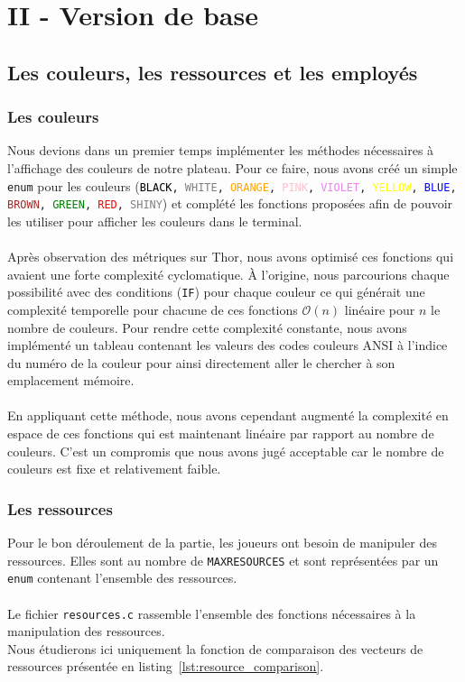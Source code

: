 
\vspace*{-0.9cm}
\section*{II - Version de base}
\subsection*{Les couleurs, les ressources et les employés}
\subsubsection*{Les couleurs}
Nous devions dans un premier temps implémenter les méthodes nécessaires à l'affichage des couleurs de notre plateau.
Pour ce faire, nous avons créé un simple \texttt{enum} pour les couleurs (\texttt{\textcolor{black}{BLACK}, \textcolor{gray}{WHITE}, \textcolor{orange}{ORANGE}, \textcolor{pink}{PINK}, \textcolor{violet}{VIOLET}, \textcolor{yellow}{YELLOW}, \textcolor{blue}{BLUE}, \textcolor{brown}{BROWN}, \textcolor{green}{GREEN}, \textcolor{red}{RED}, \textcolor{gray}{SHINY}}) et complété les fonctions proposées afin de pouvoir les utiliser pour afficher les couleurs dans le terminal.\\ \\
Après observation des métriques sur Thor, nous avons optimisé ces fonctions qui avaient une forte complexité cyclomatique.
À l'origine, nous parcourions chaque possibilité avec des conditions (\texttt{IF}) pour chaque couleur ce qui générait une complexité temporelle pour chacune de ces fonctions \(\mathcal{O}(n)\) linéaire pour \(n\) le nombre de couleurs. Pour rendre cette complexité constante, nous avons implémenté un tableau contenant les valeurs des codes couleurs ANSI à l'indice du numéro de la couleur pour ainsi directement aller le chercher à son emplacement mémoire.\\ \\
En appliquant cette méthode, nous avons cependant augmenté la complexité en espace de ces fonctions qui est maintenant linéaire par rapport au nombre de couleurs. C'est un compromis que nous avons jugé acceptable car le nombre de couleurs est fixe et relativement faible.

\subsubsection*{Les ressources}
Pour le bon déroulement de la partie, les joueurs ont besoin de manipuler des ressources.
Elles sont au nombre de \texttt{MAX\textunderscore RESOURCES} et sont représentées par un \texttt{enum} contenant l'ensemble des ressources. \\ \\
Le fichier \texttt{resources.c} rassemble l'ensemble des fonctions nécessaires à la manipulation des ressources.\\
Nous étudierons ici uniquement la fonction de comparaison des vecteurs de ressources présentée en listing~\ref{lst:resource_comparison}.

